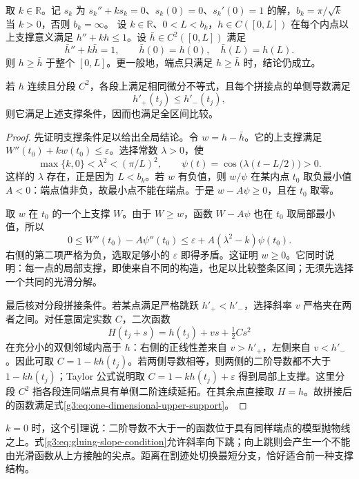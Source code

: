 \begin{lemma}\label{g3:lem:one-dimensional-support-gluing}
	取 \(k\in\mathbb R\)。记 \(s_k\) 为 \(s_k''+ks_k=0\)、\(s_k(0)=0\)、\(s_k'(0)=1\) 的解，\(b_k=\pi/\sqrt k\) 当 \(k>0\)，否则 \(b_k=\infty\)。
 设 \(k\in\mathbb R\)、\(0<L<b_k\)，\(h\in C([0,L])\) 在每个内点以上支撑意义满足 \(h''+kh\le1\)。设 \(\bar h\in C^2([0,L])\) 满足
 \[
 \bar h''+k\bar h=1,\qquad \bar h(0)=h(0),\quad \bar h(L)=h(L).
 \]
 则 \(h\ge\bar h\) 于整个 \([0,L]\)。更一般地，端点只满足 \(h\ge\bar h\) 时，结论仍成立。

 若 \(h\) 连续且分段 \(C^2\)，各段上满足相同微分不等式，且每个拼接点的单侧导数满足
 \begin{equation}\label{g3:eq:gluing-slope-condition}
 h'_+(t_j)\le h'_-(t_j),
 \end{equation}
 则它满足上述支撑条件，因而也满足全区间比较。
\end{lemma}
\begin{proof}
 先证明支撑条件足以给出全局结论。令 \(w=h-\bar h\)。它的上支撑满足 \(W''(t_0)+kw(t_0)\le\varepsilon\)。选择常数 \(\lambda>0\)，使
 \[
 \max\{k,0\}<\lambda^2<(\pi/L)^2,
 \qquad \psi(t)=\cos\bigl(\lambda(t-L/2)\bigr)>0.
 \]
 这样的 \(\lambda\) 存在，正是因为 \(L<b_k\)。若 \(w\) 有负值，则 \(w/\psi\) 在某内点 \(t_0\) 取负最小值 \(A<0\)：端点值非负，故最小点不能在端点。于是
 \(w-A\psi\ge0\)，且在 \(t_0\) 取零。

 取 \(w\) 在 \(t_0\) 的一个上支撑 \(W\)。由于 \(W\ge w\)，函数 \(W-A\psi\) 也在 \(t_0\) 取局部最小值，所以
 \[
 0\le W''(t_0)-A\psi''(t_0)
 \le\varepsilon+A(\lambda^2-k)\psi(t_0).
 \]
 右侧的第二项严格为负，选取足够小的 \(\varepsilon\) 即得矛盾。这证明 \(w\ge0\)。它同时说明：每一点的局部支撑，即使来自不同的构造，也足以比较整条区间；无须先选择一个共同的光滑分解。

 最后核对分段拼接条件。若某点满足严格跳跃 \(h'_+<h'_-\)，选择斜率 \(v\) 严格夹在两者之间。对任意固定实数 \(C\)，二次函数
 \[
 H(t_j+s)=h(t_j)+vs+\tfrac12Cs^2
 \]
 在充分小的双侧邻域内高于 \(h\)：右侧的正线性差来自 \(v>h'_+\)，左侧来自 \(v<h'_-\)。因此可取 \(C=1-kh(t_j)\)。若两侧导数相等，则两侧的二阶导数都不大于 \(1-kh(t_j)\)；Taylor 公式说明取
 \(C=1-kh(t_j)+\varepsilon\) 得到局部上支撑。这里分段 \(C^2\) 指各段连同端点具有单侧二阶连续延拓。在其余点直接取 \(H=h\)。故拼接后的函数满足式\eqref{g3:eq:one-dimensional-upper-support}。
\end{proof}

\(k=0\) 时，这个引理说：二阶导数不大于一的函数位于具有同样端点的模型抛物线之上。式\eqref{g3:eq:gluing-slope-condition}允许斜率向下跳；向上跳则会产生一个不能由光滑函数从上方接触的尖点。距离在割迹处切换最短分支，恰好适合前一种支撑结构。

